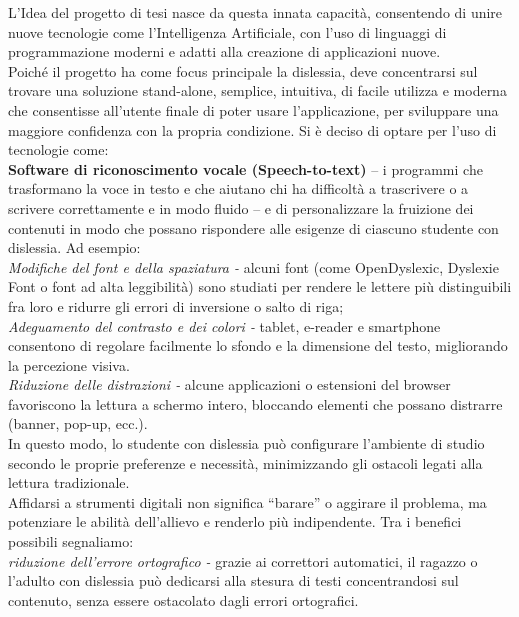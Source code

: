 \documentclass[14pt]{extbook}
\begin{document}
L'Idea del progetto di tesi nasce da questa innata capacità, consentendo di unire nuove tecnologie come l'Intelligenza Artificiale, con l'uso di linguaggi di programmazione moderni e adatti alla creazione di applicazioni nuove.\\

Poiché il progetto ha come focus principale la dislessia, deve concentrarsi sul trovare una soluzione stand-alone, semplice, intuitiva, di facile utilizza e moderna che consentisse all'utente finale di poter usare l'applicazione, per sviluppare una maggiore confidenza con la propria condizione. Si è deciso di optare per l'uso di tecnologie come:\\

\textbf{Software di riconoscimento vocale (Speech-to-text)} – i programmi che trasformano la voce in testo e che aiutano chi ha difficoltà a trascrivere o a scrivere correttamente e in modo fluido – e di personalizzare la fruizione dei contenuti in modo che possano rispondere alle esigenze di ciascuno studente con dislessia. Ad esempio:\\

\textit{Modifiche del font e della spaziatura -} alcuni font (come OpenDyslexic, Dyslexie Font o font ad alta leggibilità) sono studiati per rendere le lettere più distinguibili fra loro e ridurre gli errori di inversione o salto di riga;\\

\textit{Adeguamento del contrasto e dei colori -} tablet, e-reader e smartphone consentono di regolare facilmente lo sfondo e la dimensione del testo, migliorando la percezione visiva.\\

\textit{Riduzione delle distrazioni -} alcune applicazioni o estensioni del browser favoriscono la lettura a schermo intero, bloccando elementi che possano distrarre (banner, pop-up, ecc.).\\

In questo modo, lo studente con dislessia può configurare l’ambiente di studio secondo le proprie preferenze e necessità, minimizzando gli ostacoli legati alla lettura tradizionale.\\

Affidarsi a strumenti digitali non significa “barare” o aggirare il problema, ma potenziare le abilità dell’allievo e renderlo più indipendente. Tra i benefici possibili segnaliamo:\\

\textit{riduzione dell’errore ortografico -} grazie ai correttori automatici, il ragazzo o l’adulto con dislessia può dedicarsi alla stesura di testi concentrandosi sul contenuto, senza essere ostacolato dagli errori ortografici.\\
\end{document}
